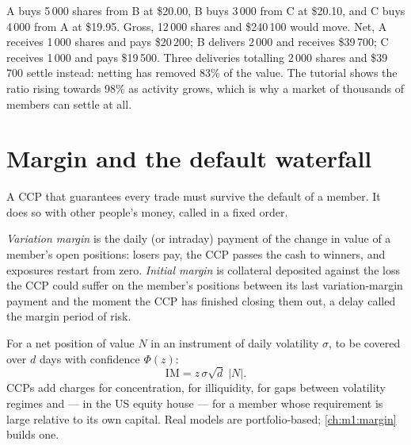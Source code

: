 \begin{example}\label{ex:m1:clearing-and-settlement:netting}
A buys 5\,000 shares from B at \$20.00, B buys 3\,000 from C at \$20.10, and C
buys 4\,000 from A at \$19.95. Gross, 12\,000 shares and \$240\,100 would
move. Net, A receives 1\,000 shares and pays \$20\,200; B delivers 2\,000 and
receives \$39\,700; C receives 1\,000 and pays \$19\,500. Three deliveries
totalling 2\,000 shares and \$39\,700 settle instead: netting has removed
83\% of the value. The tutorial shows the ratio rising towards 98\% as
activity grows, which is why a market of thousands of members can settle at
all.
\end{example}

\section{Margin and the default waterfall}

A CCP that guarantees every trade must survive the default of a member. It
does so with other people's money, called in a fixed order.

\begin{definition}\label{def:m1:clearing-and-settlement:margin}
\emph{Variation margin} is the daily (or intraday)
payment of the change in value of a member's open positions: losers pay, the
CCP passes the cash to winners, and exposures restart from zero.
\emph{Initial margin} is collateral deposited against
the loss the CCP could suffer on the member's positions between its last
variation-margin payment and the moment the CCP has finished closing them
out, a delay called the margin period of risk.
\end{definition}

\begin{method}\label{met:m1:clearing-and-settlement:im}
For a net position of value $N$ in an instrument of daily volatility
$\sigma$, to be covered over $d$ days with confidence $\Phi(z)$:
\[
\mathrm{IM} = z\,\sigma\sqrt{d}\;|N| .
\]
CCPs add charges for concentration, for illiquidity, for gaps between
volatility regimes and --- in the US equity  house --- for a member
whose requirement is large relative to its own capital. Real models are
portfolio-based; \cref{ch:m1:margin} builds one.
\end{method}

